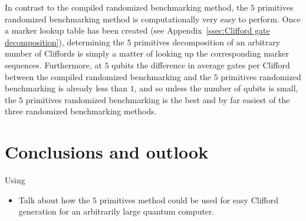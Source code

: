           In contrast to the compiled randomized benchmarking method, the $5$ primitives randomized benchmarking method is computationally very easy to perform. Once a marker lookup table has been created (see Appendix~\ref{ssec:Clifford gate decomposition}), determining the $5$ primitives decomposition of an arbitrary number of Cliffords is simply a matter of looking up the corresponding marker sequences. Furthermore, at $5$ qubits the difference in average gates per Clifford between the compiled randomized benchmarking and the $5$ primitives randomized benchmarking is already less than $1$, and so unless the number of qubits is small, the $5$ primitives randomized benchmarking is the best and by far easiest of the three randomized benchmarking methods.


  \chapter{Conclusions and outlook}

    Using

    \begin{itemize}
      \item Talk about how the $5$ primitives method could be used for easy Clifford generation for an arbitrarily large quantum computer.
    \end{itemize}